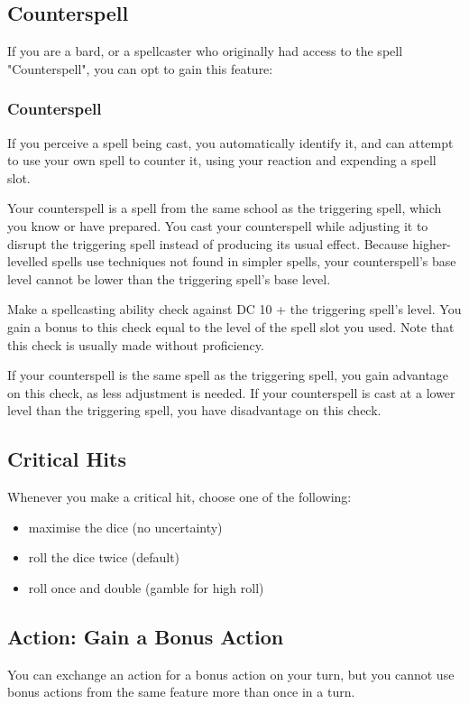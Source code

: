 \documentclass[letterpaper,twocolumn,openany,nodeprecatedcode]{dndbook}
\begin{document}
\label{counterspell}
\subsection{Counterspell}
If you are a bard, or a spellcaster who originally had access to the spell "Counterspell", you can opt to gain this feature:

\subsubsection{Counterspell}
If you perceive a spell being cast, you automatically identify it, and can attempt to use your own spell to counter it, using your reaction and expending a spell slot. 

Your counterspell is a spell from the same school as the triggering spell, which you know or have prepared. You cast your counterspell while adjusting it to disrupt the triggering spell instead of producing its usual effect. Because higher-levelled spells use techniques not found in simpler spells, your counterspell's base level cannot be lower than the triggering spell's base level. 

Make a spellcasting ability check against DC 10 + the triggering spell's level. You gain a bonus to this check equal to the level of the spell slot you used. Note that this check is usually made without proficiency.

If your counterspell is the same spell as the triggering spell, you gain advantage on this check, as less adjustment is needed. If your counterspell is cast at a lower level than the triggering spell, you have disadvantage on this check.

\subsection{Critical Hits}
Whenever you make a critical hit, choose one of the following:
\begin{itemize}
\item maximise the dice (no uncertainty)
\item roll the dice twice (default)
\item roll once and double (gamble for high roll)
\end{itemize}

\label{gameplay-bonus-action}
\subsection{Action: Gain a Bonus Action}
You can exchange an action for a bonus action on your turn, but you cannot use bonus actions from the same feature more than once in a turn.
\end{document}
